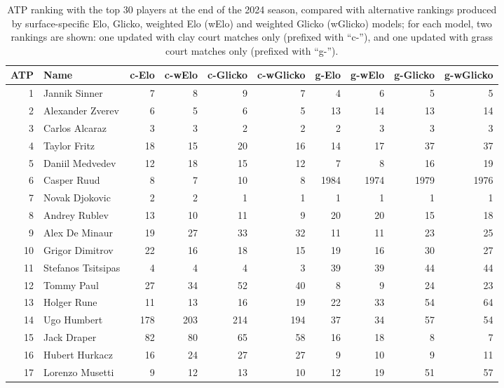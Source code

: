 \begin{table}[ht!]
  \centering
  \small
  \caption{ATP ranking with the top 30 players at the end of the 2024 season, compared with
    alternative rankings produced by surface-specific Elo, Glicko, weighted Elo (wElo) and weighted
    Glicko (wGlicko) models; for each model, two rankings are shown: one updated with clay court
    matches only (prefixed with ``c-''), and one updated with grass court matches only (prefixed with
    ``g-'').}
  \vspace{1em}
  \begin{tabular}{rlrrrrrrrr}
    \toprule
    \textbf{ATP} & \textbf{Name} & \textbf{c-Elo} & \textbf{c-wElo} & \textbf{c-Glicko} & \textbf{c-wGlicko} & \textbf{g-Elo} & \textbf{g-wElo} & \textbf{g-Glicko} & \textbf{g-wGlicko} \\
    \midrule
     1 & Jannik Sinner & 7 & 8 & 9 & 7 & 4 & 6 & 5 & 5 \\
     2 & Alexander Zverev & 6 & 5 & 6 & 5 & 13 & 14 & 13 & 14 \\
     3 & Carlos Alcaraz & 3 & 3 & 2 & 2 & 2 & 3 & 3 & 3 \\
     4 & Taylor Fritz & 18 & 15 & 20 & 16 & 14 & 17 & 37 & 37 \\
     5 & Daniil Medvedev & 12 & 18 & 15 & 12 & 7 & 8 & 16 & 19 \\
     6 & Casper Ruud & 8 & 7 & 10 & 8 & 1984 & 1974 & 1979 & 1976 \\
     7 & Novak Djokovic & 2 & 2 & 1 & 1 & 1 & 1 & 1 & 1 \\
     8 & Andrey Rublev & 13 & 10 & 11 & 9 & 20 & 20 & 15 & 18 \\
     9 & Alex De Minaur & 19 & 27 & 33 & 32 & 11 & 11 & 23 & 25 \\
    10 & Grigor Dimitrov & 22 & 16 & 18 & 15 & 19 & 16 & 30 & 27 \\
    11 & Stefanos Tsitsipas & 4 & 4 & 4 & 3 & 39 & 39 & 44 & 44 \\
    12 & Tommy Paul & 27 & 34 & 52 & 40 & 8 & 9 & 24 & 23 \\
    13 & Holger Rune & 11 & 13 & 16 & 19 & 22 & 33 & 54 & 64 \\
    14 & Ugo Humbert & 178 & 203 & 214 & 194 & 37 & 34 & 57 & 54 \\
    15 & Jack Draper & 82 & 80 & 65 & 58 & 16 & 18 & 8 & 7 \\
    16 & Hubert Hurkacz & 16 & 24 & 27 & 27 & 9 & 10 & 9 & 11 \\
    17 & Lorenzo Musetti & 9 & 12 & 13 & 10 & 12 & 19 & 51 & 57 \\

\end{tabular}
\end{table}
